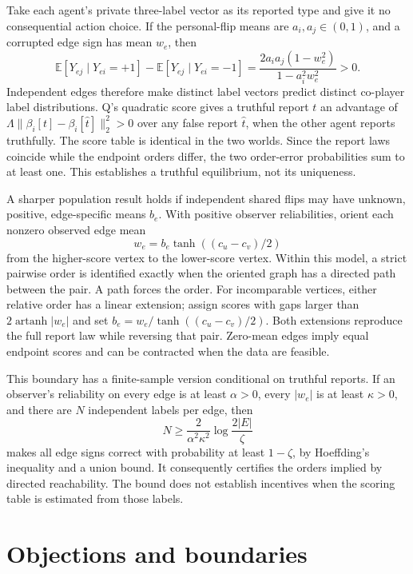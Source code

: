 \documentclass{article}
\begin{document}
Take each agent's private three-label vector as its reported type and give it
no consequential action choice. If the personal-flip means are
\(a_i,a_j\in(0,1)\), and a corrupted edge sign has mean \(w_e\), then
\[
\mathbb E[Y_{ej}\mid Y_{ei}=+1]
-\mathbb E[Y_{ej}\mid Y_{ei}=-1]
=
\frac{2a_i a_j(1-w_e^2)}{1-a_i^2w_e^2}>0.
\]
Independent edges therefore make distinct label vectors predict distinct
co-player label distributions. Q's quadratic score gives a truthful report
\(t\) an advantage of
\(\Lambda\|\beta_i[t]-\beta_i[\hat t]\|_2^2>0\) over any false report
\(\hat t\), when the other agent reports truthfully. The score table is
identical in the two worlds. Since the report laws coincide while the
endpoint orders differ, the two order-error probabilities sum to at least
one. This establishes a truthful equilibrium, not its uniqueness.

A sharper population result holds if independent shared flips may have
unknown, positive, edge-specific means \(b_e\). With positive observer
reliabilities, orient each nonzero observed edge mean
\[
w_e=b_e\tanh((c_u-c_v)/2)
\]
from the higher-score vertex to the lower-score vertex. Within this model,
a strict pairwise order is identified exactly when the oriented graph has
a directed path between the pair. A path forces the order. For incomparable
vertices, either relative order has a linear extension; assign scores with
gaps larger than \(2\operatorname{artanh}|w_e|\) and set
\(b_e=w_e/\tanh((c_u-c_v)/2)\). Both extensions reproduce the full report
law while reversing that pair. Zero-mean edges imply equal endpoint scores
and can be contracted when the data are feasible. 

This boundary has a finite-sample version conditional on truthful reports.
If an observer's reliability on every edge is at least \(\alpha>0\), every
\(|w_e|\) is at least \(\kappa>0\), and there are \(N\) independent labels
per edge, then
\[
N\geq
\frac{2}{\alpha^2\kappa^2}
\log\frac{2|E|}{\zeta}
\]
makes all edge signs correct with probability at least \(1-\zeta\), by
Hoeffding's inequality and a union bound. It consequently certifies the
orders implied by directed reachability. The bound does not establish
incentives when the scoring table is estimated from those labels.

\section{Objections and boundaries}
\end{document}
